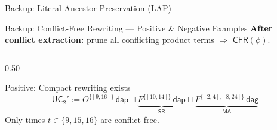 \documentclass[9pt,aspectratio=169]{beamer}
\newcommand{\dpnf}{\ensuremath{\mathsf{DPNF}}}
\newcommand{\Namb}{\ensuremath{\mathsf{CFR}}\xspace}
\newcommand{\LUCO}{\ensuremath{\mathrm{LUCO}}\xspace}
\newcommand{\LAP}{\ensuremath{\mathrm{LAP}}\xspace}
\newcommand{\delAtGate}{\ensuremath{\mathsf{dag}}\xspace}
\newcommand{\delAtPark}{\ensuremath{\mathsf{dap}}\xspace}
\newcommand{\SR}{\ensuremath{\mathsf{SR}}\xspace}
\newcommand{\MA}{\ensuremath{\mathsf{MA}}\xspace}
\newcommand{\UC}{\ensuremath{\mathsf{UC}}\xspace}
\newcommand{\ob}[2]{\ensuremath{O^{#1}\,#2}}
\newcommand{\forbb}[2]{\ensuremath{F^{#1}\,#2}}
\begin{document}
\begin{frame}{Backup: Literal Ancestor Preservation (\LAP)}
\vspace{3mm}
\centering
{}
\end{frame}

\begin{frame}{Backup: Conflict-Free Rewriting — Positive \& Negative Examples}
\small
\textbf{After conflict extraction:} prune all conflicting product terms $\Rightarrow$ $\Namb(\phi)$.

\medskip
\begin{columns}[T]
\begin{column}{0.50\textwidth}
  \begin{block}{\textcolor{ConflictGreen}{Positive: Compact rewriting exists}}
    \[
    \UC_2' := \ob{\{[9,16]\}}{\delAtPark} \sqcap \underbrace{\forbb{\{[10,14]\}}{\delAtPark}}_{\SR}
    \sqcap \underbrace{\forbb{\{[2,4],[8,24]\}}{\delAtGate}}_{\MA}
    \]
    Only times $t\!\in\!\{9,15,16\}$ are conflict-free.


\end{block}
\end{column}
\end{columns}
\end{frame}
\end{document}
